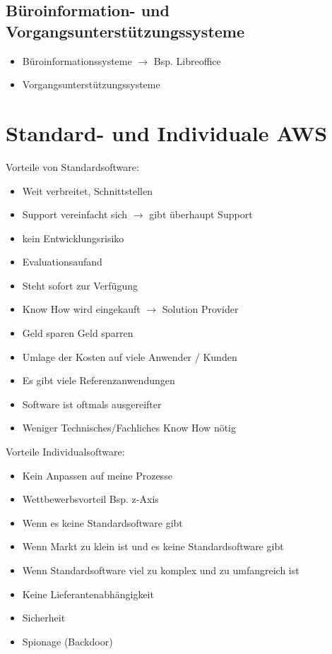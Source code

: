 \documentclass[ngerman,a4paper,12pt]{scrreprt}
\begin{document}
\subsection{Büroinformation- und Vorgangsunterstützungssysteme}
\begin{itemize}
	\item Büroinformationssysteme $\rightarrow$ Bsp. Libreoffice
	\item Vorgangsunterstützungssysteme
\end{itemize}

\section{Standard- und Individuale AWS}
Vorteile von Standardsoftware:
\begin{itemize}
	\item Weit verbreitet, Schnittstellen
	\item Support vereinfacht sich $\rightarrow$ gibt überhaupt Support
	\item kein Entwicklungsrisiko
	\item Evaluationsaufand
	\item Steht sofort zur Verfügung
	\item Know How wird eingekauft $\rightarrow$ Solution Provider
	\item Geld sparen \ra Geld sparren
	\item Umlage der Kosten auf viele Anwender / Kunden
	\item Es gibt viele Referenzanwendungen
	\item Software ist oftmals ausgereifter
	\item Weniger Technisches/Fachliches Know How nötig	
\end{itemize}

Vorteile Individualsoftware:
\begin{itemize}
	\item Kein Anpassen auf meine Prozesse
	\item Wettbewerbsvorteil \ra Bsp. z-Axis
	\item Wenn es keine Standardsoftware gibt
	\item Wenn Markt zu klein ist und es keine Standardsoftware gibt
	\item Wenn Standardsoftware viel zu komplex und zu umfangreich ist
	\item Keine Lieferantenabhängigkeit
	\item Sicherheit
	\item Spionage (Backdoor)
\end{itemize}
\end{document}
